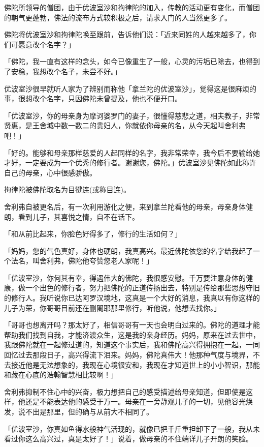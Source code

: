\documentclass[12pt,twoside,openany]{book}
\begin{document}
佛陀所领导的僧团，由于优波室沙和拘律陀的加入，传教的活动更有变化，而僧团的朝气更蓬勃，佛法的流布方式较积极之后，请求入门的人当然更多了。

佛陀将优波室沙和拘律陀唤至跟前，告诉他们说：「近来同姓的人越来越多了，你们可愿意改个名字？」

「佛陀，我一直有这样的念头，如今已像重生了一般，心灵的污垢已除去，也得到了安稳，我想改个名子，未尝不好。」

优波室沙很早就听人家为了辨别而称他「拿兰陀的优波室沙」，觉得这是很麻烦的事，很想改个名字，只因佛陀未曾提及，他也不便开口。

「优波室沙，你的母亲身为摩诃婆罗门的妻子，很懂得慈悲之道，相夫教子，非常贤惠，是王舍城中数一数二的贵妇人，你就依你母亲的名，从今天起叫舍利弗吧！」

「好的。能够和母亲那样慈爱的人起同样的名字，我非常荣幸，我今后不要输给她才好，一定要成为一个优秀的修行者。谢谢您，佛陀。」优波室沙见佛陀如此称许自己的母亲，心中很感骄傲。

拘律陀被佛陀取名为目犍连(或称目连)。

舍利弗自被更名后，有一次利用游化之便，来到拿兰陀看他的母亲，母亲身体健朗，看到儿子，其喜悦之情，自不在话下。

「和从前比起来，你脸色好得多了，修行的生活如何？」

「妈妈，您的气色真好，身体也硬朗，我真高兴。最近佛陀依您的名字给我起了一个法名，叫舍利弗，佛陀他夸赞您老人家呢！」

「优波室沙，你何其有幸，得遇伟大的佛陀，我很感安慰。千万要注意身体的健康，做一个出色的修行者，努力把佛陀的正道传扬出去，特别是传给那些思想守旧的修行人。我听说你已达阿罗汉境地，这真是一个大好的消息，我真以有你这样的儿子为荣，你哥哥目前还在删闍耶那里修行，听他说，他想去找你。」

「哥哥也想离开吗？那太好了，相信哥哥有一天也会明白过来的。佛陀的道理才能帮助我们找到自我，才能济渡众生，这是我的亲身经历。妈妈，原来在过去世中，我跟佛陀就在一起修过道的，知道这个事实后，我和佛陀高兴得拥抱在一起，一同回忆过去那段日子，高兴得流下泪来。妈妈，佛陀真伟大！他那种气度与境界，不去接近他是无法想象的，我现在心境很安和，我现在才知道世上的小小智识，那能和藏在心底的浩翰智慧相比较啊！」

舍利弗抑制不住心中的兴奋，极力想把自己的感受描述给母亲知道，但即使是这样，他还是不能表达他的感受于万一。母亲在一旁静观儿子的一切，见他容光焕发，说不出是那里，但的确与从前大不相同了。

「优波室沙，你真如鱼得水般神气活现的，就像已把千斤重担卸下了一般，我从未看过你这么高兴过，真是太好了！」说着，做母亲的不住端详儿子开朗的笑脸。
\end{document}
